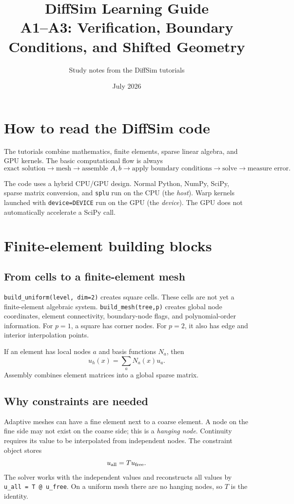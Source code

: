 \documentclass[11pt]{article}
\title{DiffSim Learning Guide\\A1--A3: Verification, Boundary Conditions, and Shifted Geometry}
\author{Study notes from the DiffSim tutorials}
\date{July 2026}
\begin{document}
\maketitle
\tableofcontents
\newpage

\section{How to read the DiffSim code}

The tutorials combine mathematics, finite elements, sparse linear algebra,
and GPU kernels. The basic computational flow is always
\[
 \text{exact solution} \to \text{mesh} \to \text{assemble } A,b
 \to \text{apply boundary conditions} \to \text{solve} \to \text{measure error}.
\]

The code uses a hybrid CPU/GPU design. Normal Python, NumPy, SciPy, sparse
matrix conversion, and \texttt{splu} run on the CPU (the \emph{host}). Warp
kernels launched with \texttt{device=DEVICE} run on the GPU (the \emph{device}).
The GPU does not automatically accelerate a SciPy call.

\section{Finite-element building blocks}

\subsection{From cells to a finite-element mesh}

\texttt{build\_uniform(level, dim=2)} creates square cells. These cells are
not yet a finite-element algebraic system. \texttt{build\_mesh(tree,p)}
creates global node coordinates, element connectivity, boundary-node flags,
and polynomial-order information. For $p=1$, a square has corner nodes. For
$p=2$, it also has edge and interior interpolation points.

If an element has local nodes $a$ and basis functions $N_a$, then
\[
 u_h(x)=\sum_a N_a(x)u_a.
\]
Assembly combines element matrices into a global sparse matrix.

\subsection{Why constraints are needed}

Adaptive meshes can have a fine element next to a coarse element. A node on
the fine side may not exist on the coarse side; this is a \emph{hanging node}.
Continuity requires its value to be interpolated from independent nodes. The
constraint object stores
\[
 u_{\rm all}=T u_{\rm free}.
\]
The solver works with the independent values and reconstructs all values by
\texttt{u\_all = T @ u\_free}. On a uniform mesh there are no hanging nodes,
so $T$ is the identity.
\end{document}
